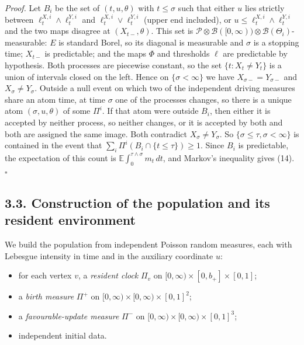 \documentclass[
  british,
  11pt,
  a4paper,
]{article}
\providecommand{\tightlist}{%
  \setlength{\itemsep}{0pt}\setlength{\parskip}{0pt}}
\begin{document}
\emph{Proof.} Let \(B_i\) be the set of \((t,u,\theta)\) with
\(t\le\sigma\) such that either \(u\) lies strictly between
\(\ell^{X,i}_t\wedge\ell^{Y,i}_t\) and \(\ell^{X,i}_t\vee\ell^{Y,i}_t\)
(upper end included), or \(u\le\ell^{X,i}_t\wedge\ell^{Y,i}_t\) and the
two maps disagree at \((X_{t-},\theta)\). This set is
\(\mathcal P\otimes\mathcal B([0,\infty))\otimes\mathcal B(\Theta_i)\)-measurable:
\(E\) is standard Borel, so its diagonal is measurable and \(\sigma\) is
a stopping time; \(X_{t-}\) is predictable; and the maps \(\Phi\) and
thresholds \(\ell\) are predictable by hypothesis. Both processes are
piecewise constant, so the set \(\{t:X_t\ne Y_t\}\) is a union of
intervals closed on the left. Hence on \(\{\sigma<\infty\}\) we have
\(X_{\sigma-}=Y_{\sigma-}\) and \(X_\sigma\ne Y_\sigma\). Outside a null
event on which two of the independent driving measures share an atom
time, at time \(\sigma\) one of the processes changes, so there is a
unique atom \((\sigma,u,\theta)\) of some \(\Pi^i\). If that atom were
outside \(B_i\), then either it is accepted by neither process, so
neither changes, or it is accepted by both and both are assigned the
same image. Both contradict \(X_\sigma\ne Y_\sigma\). So
\(\{\sigma\le\tau,\sigma<\infty\}\) is contained in the event that
\(\sum_i\Pi^i(B_i\cap\{t\le\tau\})\ge1\). Since \(B_i\) is predictable,
the expectation of this count is
\(\mathbb E\int_0^{\tau\wedge\sigma}m_t\,dt\), and Markov's inequality
gives (14). \(\square\)

\subsection{3.3. Construction of the population and its resident
environment}\label{construction-of-the-population-and-its-resident-environment}

We build the population from independent Poisson random measures, each
with Lebesgue intensity in time and in the auxiliary coordinate \(u\):

\begin{itemize}
\tightlist
\item
  for each vertex \(v\), a \emph{resident clock} \(\Pi_v\) on
  \([0,\infty)\times[0,b_+]\times[0,1]\);
\item
  a \emph{birth measure} \(\Pi^+\) on
  \([0,\infty)\times[0,\infty)\times[0,1]^2\);
\item
  a \emph{favourable-update measure} \(\Pi^-\) on
  \([0,\infty)\times[0,\infty)\times[0,1]^3\);
\item
  independent initial data.
\end{itemize}
\end{document}
